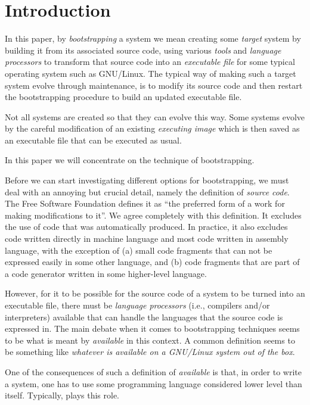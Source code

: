 \section{Introduction}
\label{sec-introduction}

In this paper, by \emph{bootstrapping} a \commonlisp{} system we mean
creating some \emph{target} \commonlisp{} system by building it from
its associated source code, using various \emph{tools} and
\emph{language processors} to transform that source code into an
\emph{executable file} for some typical operating system such as
GNU/Linux.  The typical way of making such a target \commonlisp{}
system evolve through maintenance, is to modify its source code and
then restart the bootstrapping procedure to build an updated executable
file.

Not all \commonlisp{} systems are created so that they can evolve this
way.  Some systems evolve by the careful modification of an existing
\emph{executing image} which is then saved as an executable file that
can be executed as usual.

In this paper we will concentrate on the technique of bootstrapping.

Before we can start investigating different options for bootstrapping,
we must deal with an annoying but crucial detail, namely the
definition of \emph{source code}.  The Free Software Foundation
defines it as ``the preferred form of a work for making modifications
to it''.  We agree completely with this definition.  It excludes the
use of code that was automatically produced.  In practice, it also
excludes code written directly in machine language and most code
written in assembly language, with the exception of (a) small code
fragments that can not be expressed easily in some other language, and
(b) code fragments that are part of a code generator written in some
higher-level language.

However, for it to be possible for the source code of a \commonlisp{}
system to be turned into an executable file, there must be
\emph{language processors} (i.e., compilers and/or interpreters)
available that can handle the languages that the source code is
expressed in.  The main debate when it comes to bootstrapping
techniques seems to be what is meant by \emph{available} in this
context.  A common definition seems to be something like
\emph{whatever is available on a GNU/Linux system out of the box}.

One of the consequences of such a definition of \emph{available} is
that, in order to write a \commonlisp{} system, one has to use
some programming language considered lower level than \commonlisp{}
itself.  Typically, \clanguage{} plays this role.

